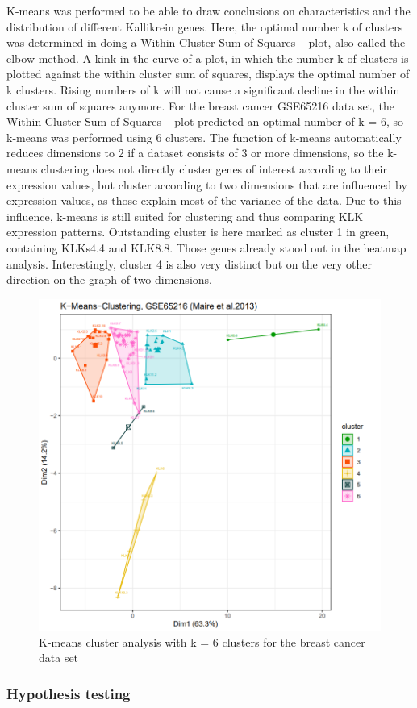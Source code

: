 \documentclass[
]{article}
\begin{document}
K-means was performed to be able to draw conclusions on characteristics
and the distribution of different Kallikrein genes. Here, the optimal
number k of clusters was determined in doing a Within Cluster Sum of
Squares -- plot, also called the elbow method. A kink in the curve of a
plot, in which the number k of clusters is plotted against the within
cluster sum of squares, displays the optimal number of k clusters.
Rising numbers of k will not cause a significant decline in the within
cluster sum of squares anymore. For the breast cancer GSE65216 data set,
the Within Cluster Sum of Squares -- plot predicted an optimal number of
k = 6, so k-means was performed using 6 clusters. The function of
k-means automatically reduces dimensions to 2 if a dataset consists of 3
or more dimensions, so the k-means clustering does not directly cluster
genes of interest according to their expression values, but cluster
according to two dimensions that are influenced by expression values, as
those explain most of the variance of the data. Due to this influence,
k-means is still suited for clustering and thus comparing KLK expression
patterns. Outstanding cluster is here marked as cluster 1 in green,
containing KLKs4.4 and KLK8.8. Those genes already stood out in the
heatmap analysis. Interestingly, cluster 4 is also very distinct but on
the very other direction on the graph of two dimensions.

\begin{figure}

{\centering \includegraphics[width=0.5\linewidth]{images/kmeans_6_breast} 

}

\caption{K-means cluster analysis with k = 6 clusters for the breast cancer data set}\label{fig:K-means plot - breast }
\end{figure}

\hypertarget{hypothesis-testing}{%
\subsubsection{Hypothesis testing}\label{hypothesis-testing}}
\end{document}
